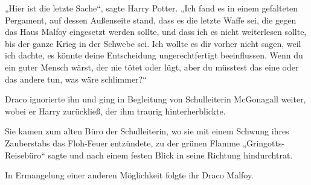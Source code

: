 „Hier ist die letzte Sache“, sagte Harry Potter.
„Ich fand es in einem gefalteten Pergament, auf dessen Außenseite stand, dass es die letzte Waffe sei, die gegen das Haus Malfoy eingesetzt werden sollte, und dass ich es nicht weiterlesen sollte, bis der ganze Krieg in der Schwebe sei. Ich wollte es dir vorher nicht sagen, weil ich dachte, es könnte deine Entscheidung ungerechtfertigt beeinflussen. Wenn du ein guter Mensch wärst, der nie tötet oder lügt, aber du müsstest das eine oder das andere tun, was wäre schlimmer?“

Draco ignorierte ihn und ging in Begleitung von Schulleiterin McGonagall weiter, wobei er Harry zurückließ, der ihm traurig hinterherblickte.

Sie kamen zum alten Büro der Schulleiterin, wo sie mit einem Schwung ihres Zauberstabs das Floh-Feuer entzündete, zu der grünen Flamme
„Gringotts-Reisebüro“ sagte und nach einem festen Blick in seine Richtung hindurchtrat.

In Ermangelung einer anderen Möglichkeit folgte ihr Draco Malfoy.

\later

